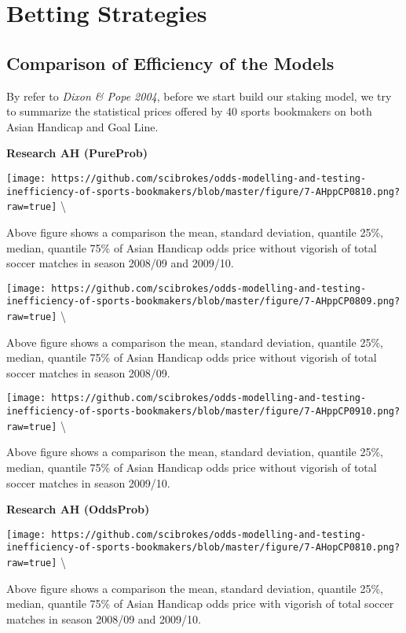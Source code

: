 \documentclass[article]{jss}
\begin{document}
\section{Betting Strategies}\label{betting-strategies}

\subsection{Comparison of Efficiency of the
Models}\label{comparison-of-efficiency-of-the-models}

By refer to \emph{Dixon \& Pope 2004}, before we start build our staking
model, we try to summarize the statistical prices offered by 40 sports
bookmakers on both Asian Handicap and Goal Line. \bigbreak

\textbf{Research AH (PureProb)} \bigbreak

\texttt{[image: https://github.com/scibrokes/odds-modelling-and-testing-inefficiency-of-sports-bookmakers/blob/master/figure/7-AHppCP0810.png?raw=true]}
\textbackslash{}

Above figure shows a comparison the mean, standard deviation, quantile
25\%, median, quantile 75\% of Asian Handicap odds price without
vigorish of total soccer matches in season 2008/09 and 2009/10.

\texttt{[image: https://github.com/scibrokes/odds-modelling-and-testing-inefficiency-of-sports-bookmakers/blob/master/figure/7-AHppCP0809.png?raw=true]}
\textbackslash{}

Above figure shows a comparison the mean, standard deviation, quantile
25\%, median, quantile 75\% of Asian Handicap odds price without
vigorish of total soccer matches in season 2008/09.

\texttt{[image: https://github.com/scibrokes/odds-modelling-and-testing-inefficiency-of-sports-bookmakers/blob/master/figure/7-AHppCP0910.png?raw=true]}
\textbackslash{}

Above figure shows a comparison the mean, standard deviation, quantile
25\%, median, quantile 75\% of Asian Handicap odds price without
vigorish of total soccer matches in season 2009/10. \bigbreak

\textbf{Research AH (OddsProb)} \bigbreak

\texttt{[image: https://github.com/scibrokes/odds-modelling-and-testing-inefficiency-of-sports-bookmakers/blob/master/figure/7-AHopCP0810.png?raw=true]}
\textbackslash{}

Above figure shows a comparison the mean, standard deviation, quantile
25\%, median, quantile 75\% of Asian Handicap odds price with vigorish
of total soccer matches in season 2008/09 and 2009/10.
\end{document}
